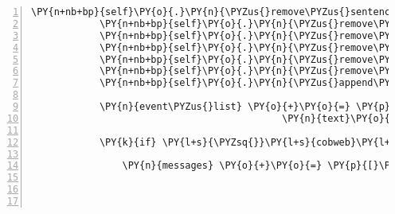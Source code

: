 \begin{Verbatim}[commandchars=\\\{\},numbers=left,firstnumber=1,stepnumber=1]
            \PY{n+nb+bp}{self}\PY{o}{.}\PY{n}{\PYZus{}remove\PYZus{}sentence}\PY{p}{(}\PY{n}{ID\PYZus{}CASSANDRA}\PY{p}{,} \PY{l+s}{\PYZsq{}}\PY{l+s}{Laut dem Schild an der Brücke ist das Überfliegen erlaubt!}\PY{l+s}{\PYZsq{}}\PY{p}{)}
            \PY{n+nb+bp}{self}\PY{o}{.}\PY{n}{\PYZus{}remove\PYZus{}sentence}\PY{p}{(}\PY{n}{ID\PYZus{}KUNI}\PY{p}{,} \PY{l+s}{\PYZsq{}}\PY{l+s}{Auf dem Schild an der Brücke steht Überfliegen erlaubt!}\PY{l+s}{\PYZsq{}}\PY{p}{)}
            \PY{n+nb+bp}{self}\PY{o}{.}\PY{n}{\PYZus{}remove\PYZus{}sentence}\PY{p}{(}\PY{n}{ID\PYZus{}KUNI}\PY{p}{,} \PY{l+s}{\PYZsq{}}\PY{l+s}{Hinter der Spinne ist doch irgendwas!}\PY{l+s}{\PYZsq{}}\PY{p}{)}
            \PY{n+nb+bp}{self}\PY{o}{.}\PY{n}{\PYZus{}remove\PYZus{}sentence}\PY{p}{(}\PY{n}{ID\PYZus{}CASSANDRA}\PY{p}{,} \PY{l+s}{\PYZsq{}}\PY{l+s}{Die Spinne verbirgt etwas!}\PY{l+s}{\PYZsq{}}\PY{p}{)}
            \PY{n+nb+bp}{self}\PY{o}{.}\PY{n}{\PYZus{}remove\PYZus{}sentence}\PY{p}{(}\PY{n}{ID\PYZus{}KUNI}\PY{p}{,} \PY{l+s}{\PYZsq{}}\PY{l+s}{Ich habe einen sehr klebrigen Spinnweb dabei.}\PY{l+s}{\PYZsq{}}\PY{p}{)}
            \PY{n+nb+bp}{self}\PY{o}{.}\PY{n}{\PYZus{}remove\PYZus{}sentence}\PY{p}{(}\PY{n}{ID\PYZus{}CASSANDRA}\PY{p}{,} \PY{l+s}{\PYZsq{}}\PY{l+s}{Ich habe einen sehr feinen klebrigen Spinnweb dabei.}\PY{l+s}{\PYZsq{}}\PY{p}{)}
            \PY{n+nb+bp}{self}\PY{o}{.}\PY{n}{\PYZus{}append\PYZus{}sentence}\PY{p}{(}\PY{n}{ID\PYZus{}CASSANDRA}\PY{p}{,} \PY{l+s}{\PYZsq{}}\PY{l+s}{Meine Flügel sind wieder heil, ich kann fliegen!}\PY{l+s}{\PYZsq{}}\PY{p}{)}

            \PY{n}{event\PYZus{}list} \PY{o}{+}\PY{o}{=} \PY{p}{[}\PY{n}{fabula}\PY{o}{.}\PY{n}{SaysEvent}\PY{p}{(}\PY{n}{identifier}\PY{o}{=}\PY{n}{ID\PYZus{}CASSANDRA}\PY{p}{,}
                                            \PY{n}{text}\PY{o}{=}\PY{l+s}{\PYZsq{}}\PY{l+s}{Meine Flügel sind wieder ganz, ich kann fliegen!}\PY{l+s}{\PYZsq{}}\PY{p}{)}\PY{p}{]}

            \PY{k}{if} \PY{l+s}{\PYZsq{}}\PY{l+s}{cobweb}\PY{l+s}{\PYZsq{}} \PY{o+ow}{not} \PY{o+ow}{in} \PY{n}{room}\PY{o}{.}\PY{n}{entity\PYZus{}dict}\PY{o}{.}\PY{n}{keys}\PY{p}{(}\PY{p}{)}\PY{p}{:}

                \PY{n}{messages} \PY{o}{+}\PY{o}{=} \PY{p}{[}\PY{n}{fabula}\PY{o}{.}\PY{n}{Message}\PY{p}{(}\PY{p}{[}\PY{n}{fabula}\PY{o}{.}\PY{n}{DropsEvent}\PY{p}{(}\PY{n}{ID\PYZus{}CASSANDRA}\PY{p}{,}
                                                               \PY{n+nb+bp}{self}\PY{o}{.}\PY{n}{host}\PY{o}{.}\PY{n}{rack}\PY{o}{.}\PY{n}{entity\PYZus{}dict}\PY{p}{[}\PY{l+s}{\PYZsq{}}\PY{l+s}{cobweb}\PY{l+s}{\PYZsq{}}\PY{p}{]}\PY{p}{,}
                                                               \PY{n}{room}\PY{o}{.}\PY{n}{entity\PYZus{}locations}\PY{p}{[}\PY{n}{ID\PYZus{}CASSANDRA}\PY{p}{]}\PY{p}{)}\PY{p}{]}\PY{p}{)}\PY{p}{]}


\end{Verbatim}
